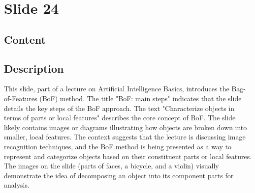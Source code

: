 \documentclass{article}%
\begin{document}
%
\newpage%
\section{Slide 24}%
\label{sec:Slide24}%
\subsection{Content}%
%
\subsection{Description}%
This slide, part of a lecture on Artificial Intelligence Basics, introduces the Bag-of-Features (BoF) method.  The title "BoF: main steps" indicates that the slide details the key steps of the BoF approach.  The text "Characterize objects in terms of parts or local features" describes the core concept of BoF.  The slide likely contains images or diagrams illustrating how objects are broken down into smaller, local features.  The context suggests that the lecture is discussing image recognition techniques, and the BoF method is being presented as a way to represent and categorize objects based on their constituent parts or local features.  The images on the slide (parts of faces, a bicycle, and a violin) visually demonstrate the idea of decomposing an object into its component parts for analysis.%
\end{document}
